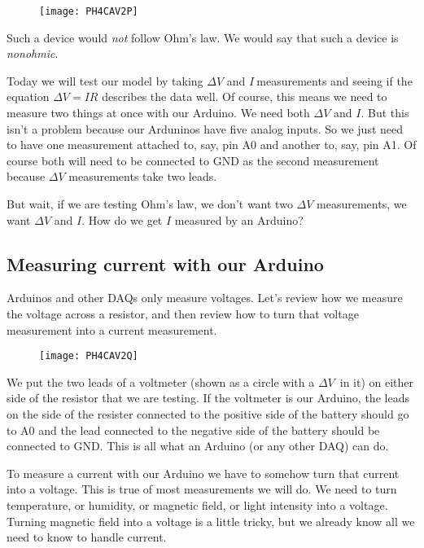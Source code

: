 \begin{figure}[h!]
	\centering
	\texttt{[image: PH4CAV2P]}
\end{figure}

\noindent Such a device would \emph{not} follow Ohm's law. We would say that such a device is \emph{nonohmic}.

Today we will test our model by taking $\Delta V$ and $I\ $measurements and
seeing if the equation $\Delta V=IR$ describes the data well. Of course,
this means we need to measure two things at once with our Arduino. We need
both $\Delta V$ and $I.$ But this isn't a problem because our Arduninos have five analog inputs. So we just need to have one measurement attached to, say, pin A0 and another to, say, pin A1. Of course both will need to be
connected to GND as the second measurement because $\Delta V$ measurements
take two leads. 

But wait, if we are testing Ohm's law, we don't want two $\Delta V$
measurements, we want $\Delta V$ and $I.$ How do we get $I$ measured by an
Arduino?

\subsection{Measuring current with our Arduino}

Arduinos and other DAQs only measure voltages. Let's review how we measure
the voltage across a resistor, and then review how to turn that voltage
measurement into a current measurement.

\begin{figure}[h!]
	\centering
	\texttt{[image: PH4CAV2Q]}
\end{figure}

We put the two leads of a voltmeter (shown as a circle with a $\Delta V$\ in it) on either side of the resistor that we are testing. If the voltmeter is our Arduino, the leads on the side of the resister connected to the positive side of the battery should go to A0 and the lead connected to the negative side of the battery should be connected to GND. This is all what an Arduino (or any other DAQ) can do.

To measure a current with our Arduino we have to somehow turn that current
into a voltage. This is true of most measurements we will do. We need to
turn temperature, or humidity, or magnetic field, or light intensity into a
voltage. Turning magnetic field into a voltage is a little tricky, but we
already know all we need to know to handle current.

